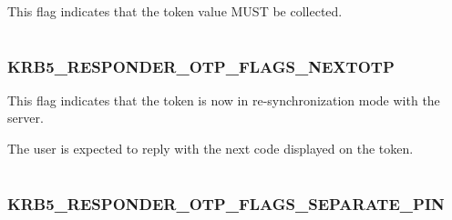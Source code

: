\documentclass[letterpaper,10pt,english]{sphinxmanual}
\begin{document}
\begin{fulllineitems}
\label{appdev/refs/macros/KRB5_RESPONDER_OTP_FLAGS_COLLECT_TOKEN:KRB5_RESPONDER_OTP_FLAGS_COLLECT_TOKEN}
\end{fulllineitems}


This flag indicates that the token value MUST be collected.

\begin{tabulary}{\linewidth}{|L|L|}
\hline

 & 
\\\hline
\end{tabulary}



\subsubsection{KRB5\_RESPONDER\_OTP\_FLAGS\_NEXTOTP}
\label{appdev/refs/macros/KRB5_RESPONDER_OTP_FLAGS_NEXTOTP:krb5-responder-otp-flags-nextotp-data}\label{appdev/refs/macros/KRB5_RESPONDER_OTP_FLAGS_NEXTOTP::doc}\label{appdev/refs/macros/KRB5_RESPONDER_OTP_FLAGS_NEXTOTP:krb5-responder-otp-flags-nextotp}

\begin{fulllineitems}
\label{appdev/refs/macros/KRB5_RESPONDER_OTP_FLAGS_NEXTOTP:KRB5_RESPONDER_OTP_FLAGS_NEXTOTP}
\end{fulllineitems}


This flag indicates that the token is now in re-synchronization mode with the server.

The user is expected to reply with the next code displayed on the token.

\begin{tabulary}{\linewidth}{|L|L|}
\hline

 & 
\\\hline
\end{tabulary}



\subsubsection{KRB5\_RESPONDER\_OTP\_FLAGS\_SEPARATE\_PIN}
\label{appdev/refs/macros/KRB5_RESPONDER_OTP_FLAGS_SEPARATE_PIN:krb5-responder-otp-flags-separate-pin}\label{appdev/refs/macros/KRB5_RESPONDER_OTP_FLAGS_SEPARATE_PIN:krb5-responder-otp-flags-separate-pin-data}\label{appdev/refs/macros/KRB5_RESPONDER_OTP_FLAGS_SEPARATE_PIN::doc}
\end{document}
